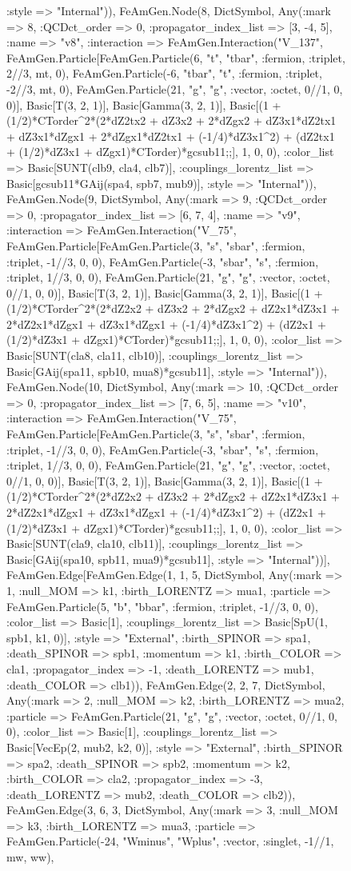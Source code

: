 \documentclass{revtex4}
\begin{document}
\begin{figure}[!htb]
\begin{center}
{:style => "Internal")), FeAmGen.Node(8, Dict{Symbol, Any}(:mark => 8, :QCDct_order => 0, :propagator_index_list => [3, -4, 5], :name => "v8", :interaction => FeAmGen.Interaction("V_137", FeAmGen.Particle[FeAmGen.Particle(6, "t", "tbar", :fermion, :triplet, 2//3, mt, 0), FeAmGen.Particle(-6, "tbar", "t", :fermion, :triplet, -2//3, mt, 0), FeAmGen.Particle(21, "g", "g", :vector, :octet, 0//1, 0, 0)], Basic[T(3, 2, 1)], Basic[Gamma(3, 2, 1)], Basic[(1 + (1/2)*CTorder^2*(2*dZ2tx2 + dZ3x2 + 2*dZgx2 + dZ3x1*dZ2tx1 + dZ3x1*dZgx1 + 2*dZgx1*dZ2tx1 + (-1/4)*dZ3x1^2) + (dZ2tx1 + (1/2)*dZ3x1 + dZgx1)*CTorder)*gcsub11;;], 1, 0, 0), :color_list => Basic[SUNT(clb9, cla4, clb7)], :couplings_lorentz_list => Basic[gcsub11*GAij(spa4, spb7, mub9)], :style => "Internal")), FeAmGen.Node(9, Dict{Symbol, Any}(:mark => 9, :QCDct_order => 0, :propagator_index_list => [6, 7, 4], :name => "v9", :interaction => FeAmGen.Interaction("V_75", FeAmGen.Particle[FeAmGen.Particle(3, "s", "sbar", :fermion, :triplet, -1//3, 0, 0), FeAmGen.Particle(-3, "sbar", "s", :fermion, :triplet, 1//3, 0, 0), FeAmGen.Particle(21, "g", "g", :vector, :octet, 0//1, 0, 0)], Basic[T(3, 2, 1)], Basic[Gamma(3, 2, 1)], Basic[(1 + (1/2)*CTorder^2*(2*dZ2x2 + dZ3x2 + 2*dZgx2 + dZ2x1*dZ3x1 + 2*dZ2x1*dZgx1 + dZ3x1*dZgx1 + (-1/4)*dZ3x1^2) + (dZ2x1 + (1/2)*dZ3x1 + dZgx1)*CTorder)*gcsub11;;], 1, 0, 0), :color_list => Basic[SUNT(cla8, cla11, clb10)], :couplings_lorentz_list => Basic[GAij(spa11, spb10, mua8)*gcsub11], :style => "Internal")), FeAmGen.Node(10, Dict{Symbol, Any}(:mark => 10, :QCDct_order => 0, :propagator_index_list => [7, 6, 5], :name => "v10", :interaction => FeAmGen.Interaction("V_75", FeAmGen.Particle[FeAmGen.Particle(3, "s", "sbar", :fermion, :triplet, -1//3, 0, 0), FeAmGen.Particle(-3, "sbar", "s", :fermion, :triplet, 1//3, 0, 0), FeAmGen.Particle(21, "g", "g", :vector, :octet, 0//1, 0, 0)], Basic[T(3, 2, 1)], Basic[Gamma(3, 2, 1)], Basic[(1 + (1/2)*CTorder^2*(2*dZ2x2 + dZ3x2 + 2*dZgx2 + dZ2x1*dZ3x1 + 2*dZ2x1*dZgx1 + dZ3x1*dZgx1 + (-1/4)*dZ3x1^2) + (dZ2x1 + (1/2)*dZ3x1 + dZgx1)*CTorder)*gcsub11;;], 1, 0, 0), :color_list => Basic[SUNT(cla9, cla10, clb11)], :couplings_lorentz_list => Basic[GAij(spa10, spb11, mua9)*gcsub11], :style => "Internal"))], FeAmGen.Edge[FeAmGen.Edge(1, 1, 5, Dict{Symbol, Any}(:mark => 1, :null_MOM => k1, :birth_LORENTZ => mua1, :particle => FeAmGen.Particle(5, "b", "bbar", :fermion, :triplet, -1//3, 0, 0), :color_list => Basic[1], :couplings_lorentz_list => Basic[SpU(1, spb1, k1, 0)], :style => "External", :birth_SPINOR => spa1, :death_SPINOR => spb1, :momentum => k1, :birth_COLOR => cla1, :propagator_index => -1, :death_LORENTZ => mub1, :death_COLOR => clb1)), FeAmGen.Edge(2, 2, 7, Dict{Symbol, Any}(:mark => 2, :null_MOM => k2, :birth_LORENTZ => mua2, :particle => FeAmGen.Particle(21, "g", "g", :vector, :octet, 0//1, 0, 0), :color_list => Basic[1], :couplings_lorentz_list => Basic[VecEp(2, mub2, k2, 0)], :style => "External", :birth_SPINOR => spa2, :death_SPINOR => spb2, :momentum => k2, :birth_COLOR => cla2, :propagator_index => -3, :death_LORENTZ => mub2, :death_COLOR => clb2)), FeAmGen.Edge(3, 6, 3, Dict{Symbol, Any}(:mark => 3, :null_MOM => k3, :birth_LORENTZ => mua3, :particle => FeAmGen.Particle(-24, "Wminus", "Wplus", :vector, :singlet, -1//1, mw, ww), }
\end{center}
\end{figure}
\end{document}
